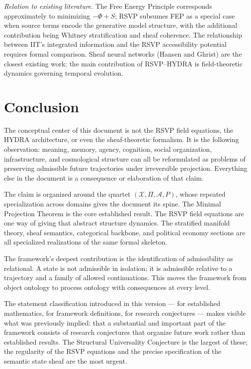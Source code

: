 \documentclass[12pt, a4paper]{article}
\theoremstyle{rsvpstyle}
\theoremstyle{definition}
\newcommand{\Traj}{\mathcal{X}}
\newcommand{\Adm}{\mathcal{A}}
\newcommand{\ProjFam}{\Pi}
\newcommand{\Persist}{P}
\begin{document}
\emph{Relation to existing literature.} The Free Energy Principle \citep{Friston2010}
corresponds approximately to minimizing $-\Phi + S$; RSVP subsumes FEP as a
special case when source terms encode the generative model structure, with the
additional contribution being Whitney stratification and sheaf coherence. The
relationship between IIT's integrated information and the RSVP accessibility
potential requires formal comparison. Sheaf neural networks (Hansen and Ghrist)
are the closest existing work; the main contribution of RSVP--HYDRA is
field-theoretic dynamics governing temporal evolution.

\section{Conclusion}

The conceptual center of this document is not the RSVP field equations,
the HYDRA architecture, or even the sheaf-theoretic formalism. It is the
following observation: meaning, memory, agency, cognition, social organization,
infrastructure, and cosmological structure can all be reformulated as problems
of preserving admissible future trajectories under irreversible projection.
Everything else in the document is a consequence or elaboration of that claim.

The claim is organized around the quartet $(\Traj, \ProjFam, \Adm, \Persist)$,
whose repeated specialization across domains gives the document its spine. The
Minimal Projection Theorem is the core established result. The RSVP field
equations are one way of giving that abstract structure dynamics. The stratified
manifold theory, sheaf semantics, categorical backbone, and political economy
sections are all specialized realizations of the same formal skeleton.

The framework's deepest contribution is the identification of admissibility
as relational. A state is not admissible in isolation; it is admissible relative
to a trajectory and a family of allowed continuations. This moves the framework
from object ontology to process ontology with consequences at every level.

The statement classification introduced in this version --- for established
mathematics, for framework definitions, for research conjectures ---
makes visible what was previously implied: that a substantial and important part
of the framework consists of research conjectures that organize future work
rather than established results. The Structural Universality Conjecture is the
largest of these; the regularity of the RSVP equations and the precise
specification of the semantic state sheaf are the most urgent.
\end{document}
